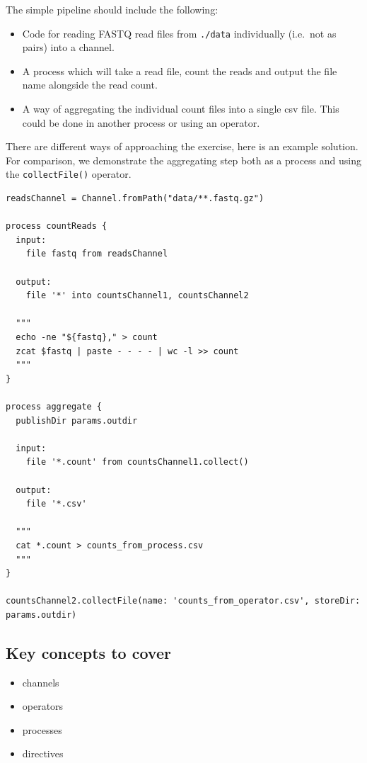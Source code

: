\begin{questions}
The simple pipeline should include the following:

\begin{itemize}
\item Code for reading FASTQ read files from \texttt{./data} individually (i.e.\ not as pairs) into a channel.
\item A process which will take a read file, count the reads and output the file name alongside the read count.
\item A way of aggregating the individual count files into a single csv file. This could be done in another process or using an operator. 
\end{itemize}

\begin{answer}

There are different ways of approaching the exercise, 
here is an example solution.
For comparison, we demonstrate the aggregating step both as a process
and using the \texttt{collectFile()} operator. 

\begin{lstlisting}
readsChannel = Channel.fromPath("data/**.fastq.gz") 

process countReads {
  input:
    file fastq from readsChannel

  output:
    file '*' into countsChannel1, countsChannel2

  """
  echo -ne "${fastq}," > count
  zcat $fastq | paste - - - - | wc -l >> count
  """
}

process aggregate {
  publishDir params.outdir

  input:
    file '*.count' from countsChannel1.collect()

  output:
    file '*.csv'

  """
  cat *.count > counts_from_process.csv
  """
}

countsChannel2.collectFile(name: 'counts_from_operator.csv', storeDir: params.outdir)
\end{lstlisting}
\end{answer}

\end{questions}
\subsection{Key concepts to cover}



\begin{itemize}
 \item channels
 \item operators
 \item processes
 \item directives
\end{itemize}

